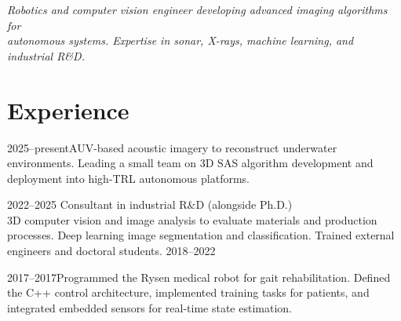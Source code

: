 \documentclass[oneside, english, 10pt, a4paper]{memoir}
\begin{document}
    \header

\vspace{10pt}
	\emph{Robotics and computer vision engineer developing advanced imaging algorithms for\\autonomous systems. Expertise in sonar, X-rays, machine learning, and industrial R\&D.}
\vspace{15pt}
    
    \section{Experience}
            {2025--present}{AUV-based acoustic imagery to reconstruct underwater environments. Leading a small team on 3D SAS algorithm development and deployment into high-TRL autonomous platforms. }{}

            {2022--2025}
            {\BulletPoint Consultant in industrial R\&D (alongside Ph.D.)\\ 3D computer vision and image analysis to evaluate materials and production processes. Deep learning image segmentation and classification. Trained external engineers and doctoral students.}
            {2018--2022}
    


            {2017--2017}{Programmed the Rysen medical robot for gait rehabilitation. Defined the C++ control architecture, implemented training tasks for patients, and integrated embedded sensors for real-time state estimation.}{}
                        
\end{document}
